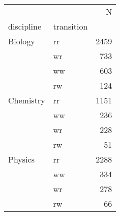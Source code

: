 \begin{tabular}{llr}
\toprule
        &    &     N \\
discipline & transition &       \\
\midrule
Biology & rr &  2459 \\
        & wr &   733 \\
        & ww &   603 \\
        & rw &   124 \\
Chemistry & rr &  1151 \\
        & ww &   236 \\
        & wr &   228 \\
        & rw &    51 \\
Physics & rr &  2288 \\
        & ww &   334 \\
        & wr &   278 \\
        & rw &    66 \\
\bottomrule
\end{tabular}
